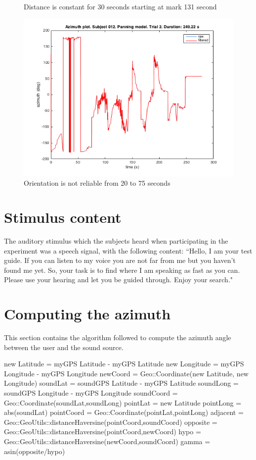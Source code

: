\documentclass[journal]{IEEEtran}
\begin{document}
\begin{appendices}
\begin{figure}[h!]
  \caption{Distance is constant for 30 seconds starting at mark 131 second}
  \label{fig:plt5}
\end{figure}

\begin{figure}[h!]
  \centering
    \includegraphics[scale=0.45]{graphics/subject012panningtrial2.png}
  \caption{Orientation is not reliable from 20 to 75 seconds}
  \label{fig:plt6}
\end{figure}

\section{Stimulus content}

The auditory stimulus which the subjects heard when participating in the experiment was a speech signal, with the following content:
``Hello, I am your test guide. If you can listen to my voice you are not far from me but you haven't found me yet. So, your task is to find where I am speaking as fast as you can. Please use your hearing and let you be guided through. Enjoy your search."

\section{Computing the azimuth}
This section contains the algorithm followed to compute the azimuth angle between the user and the sound source.
\begin{algorithm}
  new Latitude = myGPS Latitude - myGPS Latitude\;
  new Longitude = myGPS Longitude - myGPS Longitude\;
  newCoord = Geo::Coordinate(new Latitude, new Longitude)\;
  soundLat = soundGPS Latitude - myGPS Latitude\;
  soundLong = soundGPS Longitude - myGPS Longitude\;
  soundCoord = Geo::Coordinate(soundLat,soundLong)\;
  pointLat = new Latitude\;
  pointLong = abs(soundLat)\;
  pointCoord = Geo::Coordinate(pointLat,pointLong)\;
  adjacent = Geo::GeoUtils::distanceHaversine(pointCoord,soundCoord)\;
  opposite = Geo::GeoUtils::distanceHaversine(pointCoord,newCoord)\;
  hypo = Geo::GeoUtils::distanceHaversine(newCoord,soundCoord)\;
  gamma = asin(opposite/hypo)\;


\end{algorithm}
\end{appendices}
\end{document}
